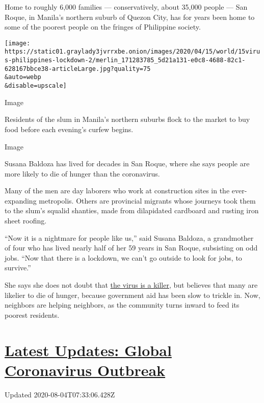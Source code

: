 Home to roughly 6,000 families --- conservatively, about 35,000 people
--- San Roque, in Manila's northern suburb of Quezon City, has for years
been home to some of the poorest people on the fringes of Philippine
society.

\texttt{[image: https://static01.graylady3jvrrxbe.onion/images/2020/04/15/world/15virus-philippines-lockdown-2/merlin\_171283785\_5d21a131-e0c8-4688-82c1-628167bbce38-articleLarge.jpg?quality=75\\\&auto=webp\\\&disable=upscale]}

Image

Residents of the slum in Manila's northern suburbs flock to the market
to buy food before each evening's curfew begins.

Image

Susana Baldoza has lived for decades in San Roque, where she says people
are more likely to die of hunger than the coronavirus.

Many of the men are day laborers who work at construction sites in the
ever-expanding metropolis. Others are provincial migrants whose journeys
took them to the slum's squalid shanties, made from dilapidated
cardboard and rusting iron sheet roofing.

``Now it is a nightmare for people like us,'' said Susana Baldoza, a
grandmother of four who has lived nearly half of her 59 years in San
Roque, subsisting on odd jobs. ``Now that there is a lockdown, we can't
go outside to look for jobs, to survive.''

She says she does not doubt that
\href{https://www.nytimes3xbfgragh.onion/2020/02/02/world/asia/philippines-coronavirus-china.html}{the
virus is a killer}, but believes that many are likelier to die of
hunger, because government aid has been slow to trickle in. Now,
neighbors are helping neighbors, as the community turns inward to feed
its poorest residents.

\hypertarget{latest-updates-global-coronavirus-outbreak}{%
\section{\texorpdfstring{\href{https://www.nytimes3xbfgragh.onion/2020/08/03/world/coronavirus-covid-19.html?action=click\&pgtype=Article\&state=default\&region=MAIN_CONTENT_1\&context=storylines_live_updates}{Latest
Updates: Global Coronavirus
Outbreak}}{Latest Updates: Global Coronavirus Outbreak}}\label{latest-updates-global-coronavirus-outbreak}}

Updated 2020-08-04T07:33:06.428Z

